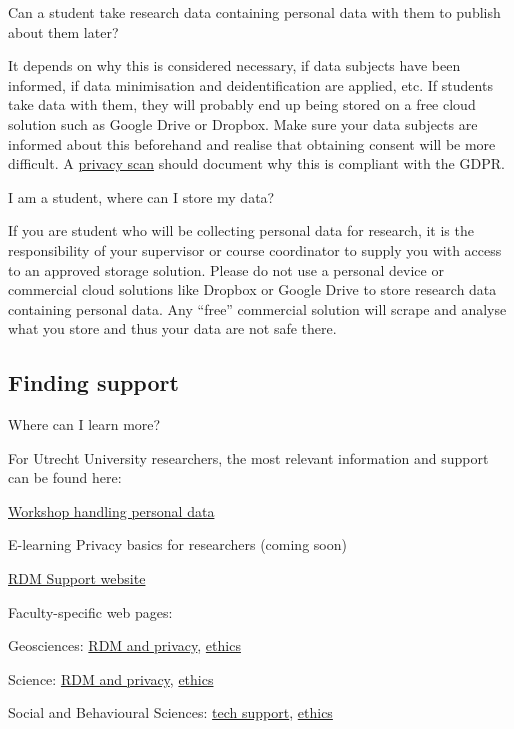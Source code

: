 \documentclass[
]{book}
\begin{document}
Can a student take research data containing personal data with them to publish about them later?

It depends on why this is considered necessary, if data subjects have been informed, if data minimisation and deidentification are applied, etc. If students take data with them, they will probably end up being stored on a free cloud solution such as Google Drive or Dropbox. Make sure your data subjects are informed about this beforehand and realise that obtaining consent will be more difficult. A \protect\hyperlink{privacy-scan}{privacy scan} should document why this is compliant with the GDPR.

I am a student, where can I store my data?

If you are student who will be collecting personal data for research, it is the responsibility of your supervisor or course coordinator to supply you with access to an approved storage solution. Please do not use a personal device or commercial cloud solutions like Dropbox or Google Drive to store research data containing personal data. Any ``free'' commercial solution will scrape and analyse what you store and thus your data are not safe there.

\hypertarget{finding-support}{%
\subsection{Finding support}\label{finding-support}}

Where can I learn more?

For Utrecht University researchers, the most relevant information and support can be found here:

\href{https://www.uu.nl/en/research/research-data-management/training-workshops/handling-personal-data-in-research}{Workshop handling personal data}

E-learning Privacy basics for researchers (coming soon)

\href{https://www.uu.nl/rdm}{RDM Support website}

Faculty-specific web pages:

Geosciences: \href{https://geo-data-support.sites.uu.nl/}{RDM and privacy}, \href{https://sciencegeo-erb.sites.uu.nl/}{ethics}

Science: \href{https://science-data-support.sites.uu.nl/}{RDM and privacy}, \href{https://sciencegeo-erb.sites.uu.nl/}{ethics}

Social and Behavioural Sciences: \href{https://techsupport.fss.uu.nl/}{tech support}, \href{https://ferb.sites.uu.nl/}{ethics}
\end{document}
